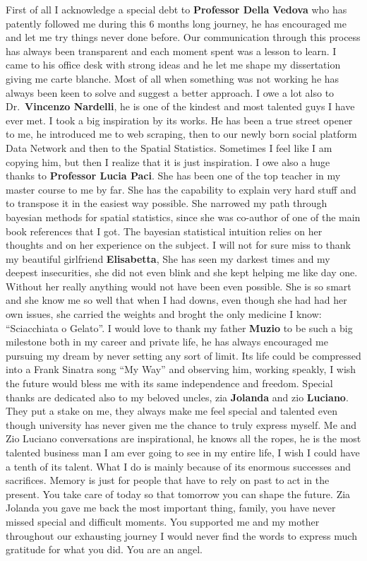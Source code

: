 \documentclass[
  12pt,
  a4paper,
  oneside]{book}
\theoremstyle{definition}
\theoremstyle{definition}
\theoremstyle{definition}
\theoremstyle{remark}
\begin{document}
First of all I acknowledge a special debt to \textbf{Professor Della Vedova} who has patently followed me during this 6 months long journey, he has encouraged me and let me try things never done before. Our communication through this process has always been transparent and each moment spent was a lesson to learn. I came to his office desk with strong ideas and he let me shape my dissertation giving me carte blanche. Most of all when something was not working he has always been keen to solve and suggest a better approach. I owe a lot also to Dr.~\textbf{Vincenzo Nardelli}, he is one of the kindest and most talented guys I have ever met. I took a big inspiration by its works. He has been a true street opener to me, he introduced me to web scraping, then to our newly born social platform Data Network and then to the Spatial Statistics. Sometimes I feel like I am copying him, but then I realize that it is just inspiration. I owe also a huge thanks to \textbf{Professor Lucia Paci}. She has been one of the top teacher in my master course to me by far. She has the capability to explain very hard stuff and to transpose it in the easiest way possible. She narrowed my path through bayesian methods for spatial statistics, since she was co-author of one of the main book references that I got. The bayesian statistical intuition relies on her thoughts and on her experience on the subject.
I will not for sure miss to thank my beautiful girlfriend \textbf{Elisabetta}, She has seen my darkest times and my deepest insecurities, she did not even blink and she kept helping me like day one. Without her really anything would not have been even possible. She is so smart and she know me so well that when I had downs, even though she had had her own issues, she carried the weights and broght the only medicine I know: ``Sciacchiata o Gelato''. I would love to thank my father \textbf{Muzio} to be such a big milestone both in my career and private life, he has always encouraged me pursuing my dream by never setting any sort of limit. Its life could be compressed into a Frank Sinatra song ``My Way'' and observing him, working speakly, I wish the future would bless me with its same independence and freedom. Special thanks are dedicated also to my beloved uncles, zia \textbf{Jolanda} and zio \textbf{Luciano}. They put a stake on me, they always make me feel special and talented even though university has never given me the chance to truly express myself. Me and Zio Luciano conversations are inspirational, he knows all the ropes, he is the most talented business man I am ever going to see in my entire life, I wish I could have a tenth of its talent. What I do is mainly because of its enormous successes and sacrifices. Memory is just for people that have to rely on past to act in the present. You take care of today so that tomorrow you can shape the future. Zia Jolanda you gave me back the most important thing, family, you have never missed special and difficult moments. You supported me and my mother throughout our exhausting journey I would never find the words to express much gratitude for what you did. You are an angel.
\end{document}

